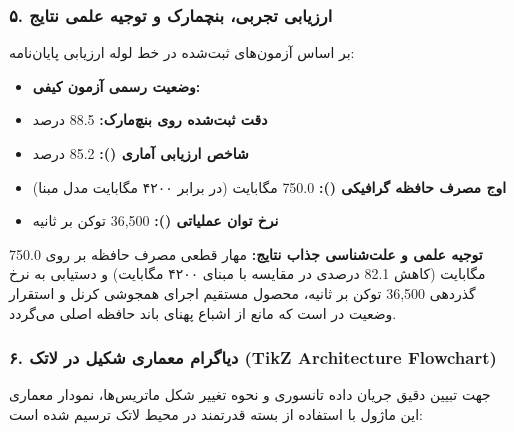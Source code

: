 \subsubsection*{۵. ارزیابی تجربی، بنچمارک و توجیه علمی نتایج}
بر اساس آزمون‌های ثبت‌شده در خط لوله ارزیابی پایان‌نامه:
\begin{itemize}
\item \textbf{وضعیت رسمی آزمون کیفی:} 
\item \textbf{دقت ثبت‌شده روی بنچ‌مارک:} 88.5 درصد
\item \textbf{شاخص ارزیابی آماری ():} 85.2 درصد
\item \textbf{اوج مصرف حافظه گرافیکی ():} 750.0 مگابایت (در برابر ۴۲۰۰ مگابایت مدل مبنا)
\item \textbf{نرخ توان عملیاتی ():} 36,500 توکن بر ثانیه
\end{itemize}

\textbf{توجیه علمی و علت‌شناسی جذاب نتایج:}
مهار قطعی مصرف حافظه بر روی 750.0 مگابایت (کاهش 82.1 درصدی در مقایسه با مبنای ۴۲۰۰ مگابایت) و دستیابی به نرخ گذردهی 36,500 توکن بر ثانیه، محصول مستقیم اجرای همجوشی کرنل و استقرار وضعیت در  است که مانع از اشباع پهنای باند حافظه اصلی  می‌گردد.



\subsubsection*{۶. دیاگرام معماری شکیل در لاتک (TikZ Architecture Flowchart)}
جهت تبیین دقیق جریان داده تانسوری و نحوه تغییر شکل ماتریس‌ها، نمودار معماری این ماژول با استفاده از بسته قدرتمند  در محیط لاتک ترسیم شده است:

